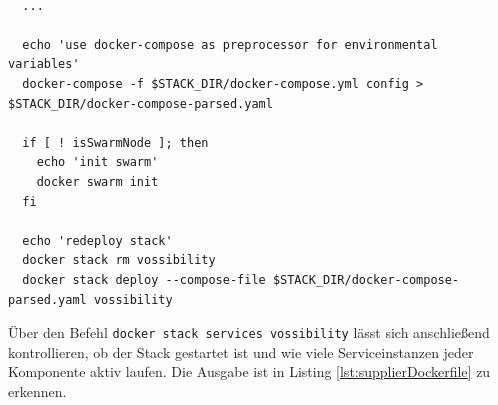 \begin{lstlisting}[style=bashStyle,caption={start-stack-services.sh},label=lst:summary-start-stack-services]

  ...

  echo 'use docker-compose as preprocessor for environmental variables'
  docker-compose -f $STACK_DIR/docker-compose.yml config > $STACK_DIR/docker-compose-parsed.yaml

  if [ ! isSwarmNode ]; then
    echo 'init swarm'
    docker swarm init
  fi

  echo 'redeploy stack'
  docker stack rm vossibility
  docker stack deploy --compose-file $STACK_DIR/docker-compose-parsed.yaml vossibility
\end{lstlisting}

Über den Befehl \verb+docker stack services vossibility+ lässt sich anschließend kontrollieren, ob der Stack gestartet ist und wie viele Serviceinstanzen jeder Komponente aktiv laufen. Die Ausgabe ist in Listing \ref{lst:supplierDockerfile} zu erkennen.

